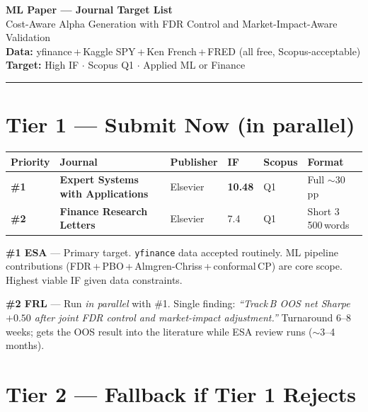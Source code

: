 \documentclass[11pt,a4paper]{article}
\begin{document}
\begin{center}
  {\LARGE\bfseries ML Paper — Journal Target List}\\[0.5em]
  {\large\color{accent} Cost-Aware Alpha Generation with FDR Control
   and Market-Impact-Aware Validation}\\[0.8em]
  {\small
    \textbf{Data:} yfinance\,+\,Kaggle SPY\,+\,Ken French\,+\,FRED
    (all free, Scopus-acceptable)\\
    \textbf{Target:} High IF $\cdot$ Scopus Q1 $\cdot$ Applied ML or Finance
  }
\end{center}

\vspace{0.5em}\hrule\vspace{1.2em}

\section*{\textcolor{tier1}{Tier 1 — Submit Now (in parallel)}}

\begin{tabularx}{\linewidth}{llXlll}
\toprule
\textbf{Priority} & \textbf{Journal} & \textbf{Publisher} & \textbf{IF} & \textbf{Scopus} & \textbf{Format}\\
\midrule
\textbf{\#1} & \textbf{Expert Systems with Applications} & Elsevier & \textbf{10.48} & Q1 & Full $\sim$30\,pp\\
\textbf{\#2} & \textbf{Finance Research Letters}          & Elsevier & 7.4  & Q1 & Short 3\,500\,words\\
\bottomrule
\end{tabularx}

\vspace{0.6em}
\textbf{\#1 ESA} — Primary target. \texttt{yfinance} data accepted routinely.
ML pipeline contributions (FDR\,+\,PBO\,+\,Almgren-Chriss\,+\,conformal\,CP)
are core scope. Highest viable IF given data constraints.

\textbf{\#2 FRL} — Run \emph{in parallel} with \#1. Single finding: \emph{``Track\,B
OOS net Sharpe\,$+0.50$ after joint FDR control and market-impact adjustment.''}
Turnaround 6--8 weeks; gets the OOS result into the literature while ESA review
runs ($\sim$3--4 months).

\section*{\textcolor{tier2}{Tier 2 — Fallback if Tier 1 Rejects}}
\end{document}

